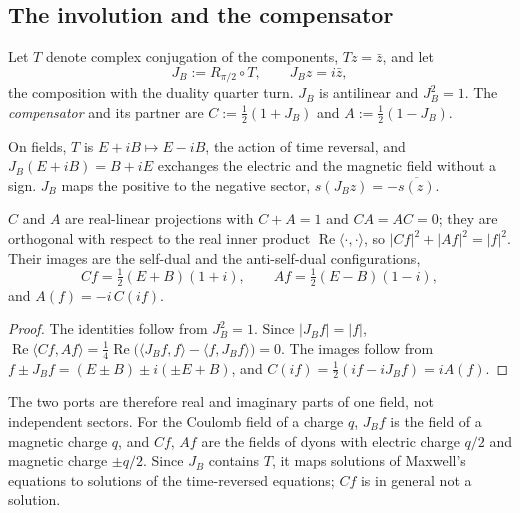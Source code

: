 \subsection{The involution and the compensator}

\begin{definition}\label{def:compensator}
Let \(T\) denote complex conjugation of the components, \(Tz=\bar z\), and let
\begin{equation}\label{eq:JB}
J_B:=R_{\pi/2}\circ T,\qquad J_Bz=i\bar z,
\end{equation}
the composition with the duality quarter turn.  \(J_B\) is antilinear and \(J_B^2=1\).  The \emph{compensator} and its partner are
\(C:=\tfrac12(1+J_B)\) and \(A:=\tfrac12(1-J_B)\).
\end{definition}

On fields, \(T\) is \(E+iB\mapsto E-iB\), the action of time reversal, and \(J_B(E+iB)=B+iE\) exchanges the electric and the magnetic field
without a sign.  \(J_B\) maps the positive to the negative sector, \(s(J_Bz)=-\overline{s(z)}\).

\begin{proposition}\label{prop:ports}
\(C\) and \(A\) are real-linear projections with \(C+A=1\) and \(CA=AC=0\); they are orthogonal with respect to the real inner product
\(\operatorname{Re}\langle\cdot,\cdot\rangle\), so \(|Cf|^2+|Af|^2=|f|^2\).  Their images are the self-dual and the anti-self-dual configurations,
\[
Cf=\tfrac12(E+B)(1+i),\qquad Af=\tfrac12(E-B)(1-i),
\]
and \(A(f)=-i\,C(if)\).
\end{proposition}

\begin{proof}
The identities follow from \(J_B^2=1\).  Since \(|J_Bf|=|f|\),
\(\operatorname{Re}\langle Cf,Af\rangle=\tfrac14\operatorname{Re}\bigl(\langle J_Bf,f\rangle-\langle f,J_Bf\rangle\bigr)=0\).  The images follow from
\(f\pm J_Bf=(E\pm B)\pm i(\pm E+B)\), and \(C(if)=\tfrac12(if-iJ_Bf)=iA(f)\).
\end{proof}

The two ports are therefore real and imaginary parts of one field, not independent sectors.  For the Coulomb field of a charge \(q\),
\(J_Bf\) is the field of a magnetic charge \(q\), and \(Cf\), \(Af\) are the fields of dyons with electric charge \(q/2\) and magnetic charge
\(\pm q/2\).  Since \(J_B\) contains \(T\), it maps solutions of Maxwell's equations to solutions of the time-reversed equations; \(Cf\) is in
general not a solution.

